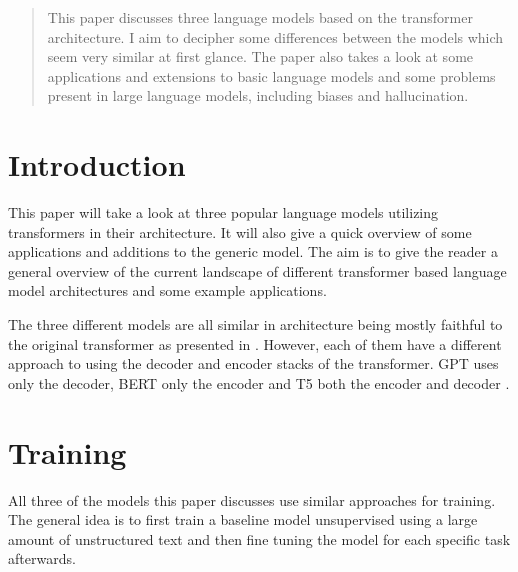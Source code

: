 \documentclass[twoside]{article}
\begin{document}
%

%


\begin{abstract}
  This paper discusses three language models based on the transformer architecture.
  I aim to decipher some differences between the models which seem very similar at first glance.
  The paper also takes a look at some applications and extensions to basic language
  models and some problems present in large language models, including biases
  and hallucination.
\end{abstract}

\section{Introduction}
This paper will take a look at three popular language models utilizing
transformers in their architecture. It will also give a quick overview
of some applications and additions to the generic model. The aim is to
give the reader a general overview of the current landscape of different
transformer based language model architectures and some example applications.

The three different models are all similar in architecture being mostly
faithful to the original transformer as presented in 
\cite{vaswani_attention_2017}. However, each of them have a different approach
to using the decoder and encoder stacks of the transformer. GPT uses only
the decoder, BERT only the encoder and T5 both the encoder and decoder
\cite{radford_improving_nodate,devlin_bert_2019,raffel_exploring_2020}.

\section{Training}
All three of the models this paper discusses use similar approaches for 
training. The general idea is to first train a baseline model unsupervised 
using a large amount of unstructured text and then fine tuning the model
for each specific task afterwards. 
\end{document}
